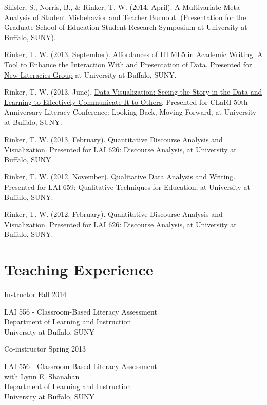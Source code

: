 \begin{innerlist}

    \item Shisler, S., Norris, B., \& Rinker, T. W. (2014, April). A Multivariate Meta-Analysis of Student Misbehavior and Teacher Burnout. (Presentation for the Graduate School of Education Student Research Symposium at University at Buffalo, SUNY).
    \item Rinker, T. W. (2013, September). Affordances of HTML5 in Academic Writing: A Tool to Enhance the Interaction With and Presentation of Data.  Presented for \href{http://gse.buffalo.edu/org/nlg/}{New Literacies Group} at University at Buffalo, SUNY.
    \item Rinker, T. W. (2013, June). \href{http://www.youtube.com/watch?v=IHHPO4VhucY}{Data Visualization: Seeing the Story in the Data and Learning to Effectively Communicate It to Others}.  Presented for CLaRI 50th Anniversary Literacy Conference: Looking Back, Moving Forward, at University at Buffalo, SUNY.
	\item Rinker, T. W. (2013, February). Quantitative Discourse Analysis and Visualization. Presented for LAI 626: Discourse Analysis, at University at Buffalo, SUNY.
	\item Rinker, T. W. (2012, November). Qualitative Data Analysis and Writing. Presented for LAI 659: Qualitative Techniques for Education, at University at Buffalo, SUNY.
	\item Rinker, T. W. (2012, February). Quantitative Discourse Analysis and Visualization. Presented for LAI 626: Discourse Analysis, at University at Buffalo, SUNY.
\end{innerlist}

\section{Teaching Experience}

Instructor \hfill {Fall 2014}
\begin{innerlist}
\item[] LAI 556 - Classroom-Based Literacy Assessment\\
        Department of Learning and Instruction\\
        University at Buffalo, SUNY
\end{innerlist}

Co-instructor \hfill {Spring 2013}
\begin{innerlist}
\item[] LAI 556 - Classroom-Based Literacy Assessment\\
        with Lynn E. Shanahan\\
        Department of Learning and Instruction\\
        University at Buffalo, SUNY
\end{innerlist}


